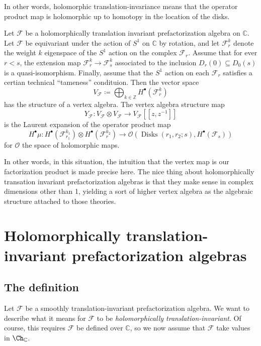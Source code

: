 In other words, holomorphic translation-invariance means that the operator product map is holomorphic up to homotopy in the location of the disks.

\begin{theorem}\label{thm:5-0-4}
	Let $\mathcal{F} $ be a holomorphically translation invariant prefactorization algebra on $\mathbb{C} $. Let $\mathcal{F} $ be equivariant under the action of $S^1$ on $\mathbb{C} $ by rotation, and let $\mathcal{F} _{r} ^k$ denote the weight $k$ eigenspace of the $S^1$ action on the complex $\mathcal{F} _r$. Assume that for ever $r<s$, the extension map $\mathcal{F} _r^k \to \mathcal{F} _s^k$ associated to the inclusion $D_r(0) \subseteq D_0(s)$ is a quasi-isomorphism. Finally, assume that the $S^1$ action on each $\mathcal{F} _r$ satisfies a certian technical ``tameness'' condituion. Then the vector space
	\[
		V_{\mathcal{F} } \coloneqq \bigoplus_{k\in\mathbb{Z} } H^{\bullet} (\mathcal{F} _r^k)
	\]
	has the structure of a vertex algebra. The vertex algebra structure map
	\[
		Y_{\mathcal{F} } : V_{\mathcal{F} } \otimes V_{\mathcal{F} }  \to V_{\mathcal{F} } [[z,z^{-1} ]]
	\]
	is the Laurent expansion of the operator product map
	\[
		H^{\bullet} \mu : H^{\bullet} (\mathcal{F} _{r_1} ^{k_1} )\otimes H^{\bullet} (\mathcal{F} _{r} ^{k_2} ) \to \mathcal{O} (\operatorname{Disks} (r_1, r_2 ; s), H^{\bullet} (\mathcal{F} _s))
	\]
	for $\mathcal{O} $ the space of holomorphic maps.
\end{theorem}
In other words, in this situation, the intuition that the vertex map is our factorization product is made precise here. The nice thing about holomorphically transation invariant prefactorization algebras is that they make sense in complex dimensions other than 1, yielding a sort of higher vertex algebra as the algebraic structure attached to those theories.

\section{Holomorphically translation-invariant prefactorization algebras}

\subsection{The definition}

Let $\mathcal{F} $ be a smoothly translation-invariant prefactorization algebra. We want to describe what it means for $\mathcal{F} $ to be \emph{holomorphically translation-invariant}. Of course, this requires $\mathcal{F} $ be defined over $\mathbb{C} $, so we now assume that $\mathcal{F}$ take values in $\Ch_{\mathbb{C} } $.

